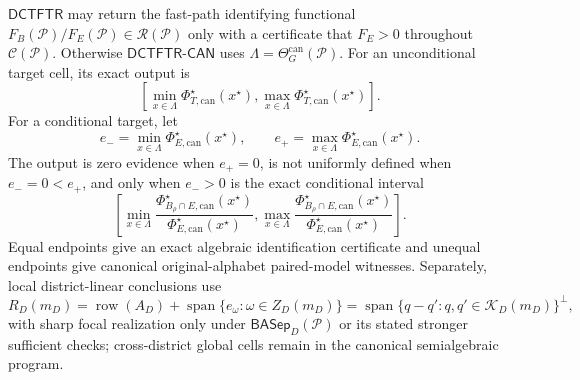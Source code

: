 \(\mathsf{DCTFTR}\) may return the fast-path identifying functional \(F_B(\mathcal P)/F_E(\mathcal P)\in\mathscr R(\mathcal P)\) only with a certificate that \(F_E>0\) throughout \(\mathcal C(\mathcal P)\).  Otherwise \(\mathsf{DCTFTR\text{-}CAN}\) uses \(\Lambda=\Theta_G^{\mathrm{can}}(\mathcal P)\).  For an unconditional target cell, its exact output is
\[
\left[
\min_{x\in\Lambda}\Phi_{T,\mathrm{can}}^\star(x^\star),
\max_{x\in\Lambda}\Phi_{T,\mathrm{can}}^\star(x^\star)
\right].
\]
For a conditional target, let
\[
e_-=\min_{x\in\Lambda}\Phi_{E,\mathrm{can}}^\star(x^\star),
\qquad
e_+=\max_{x\in\Lambda}\Phi_{E,\mathrm{can}}^\star(x^\star).
\]
The output is zero evidence when \(e_+=0\), is not uniformly defined when \(e_-=0<e_+\), and only when \(e_->0\) is the exact conditional interval
\[
\left[
\min_{x\in\Lambda}
\frac{\Phi_{B_\rho\cap E,\mathrm{can}}^\star(x^\star)}
{\Phi_{E,\mathrm{can}}^\star(x^\star)},
\max_{x\in\Lambda}
\frac{\Phi_{B_\rho\cap E,\mathrm{can}}^\star(x^\star)}
{\Phi_{E,\mathrm{can}}^\star(x^\star)}
\right].
\]
Equal endpoints give an exact algebraic identification certificate and unequal endpoints give canonical original-alphabet paired-model witnesses.  Separately, local district-linear conclusions use
\[
R_D(m_D)=\operatorname{row}(A_D)+\operatorname{span}\{e_\omega:\omega\in Z_D(m_D)\}
=\operatorname{span}\{q-q':q,q'\in\mathcal K_D(m_D)\}^{\perp},
\]
with sharp focal realization only under \(\mathsf{BASep}_D(\mathcal P)\) or its stated stronger sufficient checks; cross-district global cells remain in the canonical semialgebraic program.